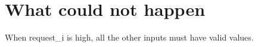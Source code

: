 \section{What could not happen}

When request\_i is high, all the other inputs must have valid values.
    